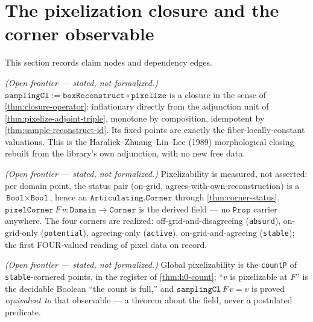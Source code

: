 \section{The pixelization closure and the corner observable}

This section records claim nodes and dependency edges.

\begin{theorem}\label{thm:pixelization-closure}\notready{}
\emph{(Open frontier --- stated, not formalized.)} $\texttt{samplingCl} :=
\texttt{boxReconstruct} \circ \texttt{pixelize}$ is a closure in the sense of
\cref{thm:closure-operator}: inflationary directly from the adjunction unit of
\cref{thm:pixelize-adjoint-triple}, monotone by composition, idempotent by
\cref{thm:sample-reconstruct-id}. Its fixed points are exactly the fiber-locally-constant
valuations. This is the Haralick--Zhuang--Lin--Lee (1989) morphological closing rebuilt
from the library's own adjunction, with no new free data.
\end{theorem}

\begin{proposition}\label{thm:pixel-corner-observable}\notready{}
\emph{(Open frontier --- stated, not formalized.)} Pixelizability is measured, not
asserted: per domain point, the status pair (on-grid, agrees-with-own-reconstruction)
is a $\texttt{Bool} \times \texttt{Bool}$, hence an $\texttt{Articulating.Corner}$
through \cref{thm:corner-status}. $\texttt{pixelCorner}\,F\,v : \texttt{Domain} \to
\texttt{Corner}$ is the derived field --- no $\texttt{Prop}$ carrier anywhere. The four
corners are realized: off-grid-and-disagreeing (\texttt{absurd}), on-grid-only
(\texttt{potential}), agreeing-only (\texttt{active}), on-grid-and-agreeing
(\texttt{stable}); the first FOUR-valued reading of pixel data on record.
\end{proposition}

\begin{theorem}\label{thm:pixelizable-count}\notready{}
\emph{(Open frontier --- stated, not formalized.)} Global pixelizability is the
\texttt{countP} of \texttt{stable}-cornered points, in the register of
\cref{thm:h0-count}; ``$v$ is pixelizable at $F$'' is the decidable Boolean ``the count
is full,'' and $\texttt{samplingCl}\,F\,v = v$ is proved \emph{equivalent to} that
observable --- a theorem about the field, never a postulated predicate.
\end{theorem}
